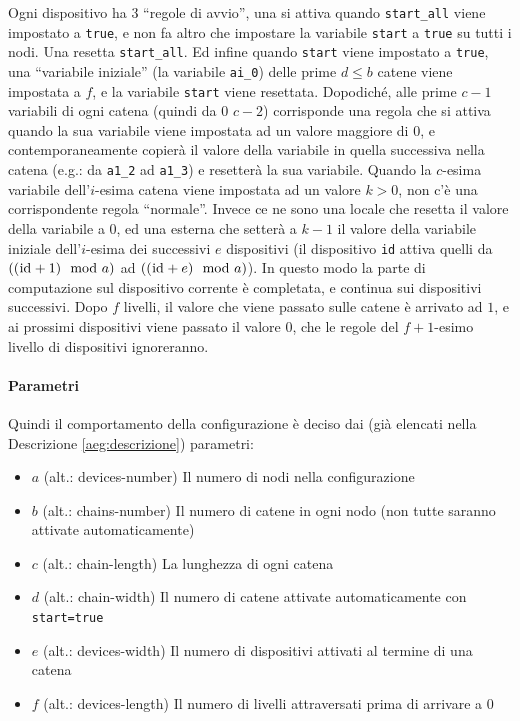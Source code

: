 \documentclass[12pt, a4paper]{article}
\begin{document}
Ogni dispositivo ha 3 ``regole di avvio'', una si attiva quando \lstinline{start_all} viene impostato a \lstinline{true}, e non fa altro che impostare la variabile \lstinline{start} a \lstinline{true} su tutti i nodi. Una resetta \lstinline{start_all}. Ed infine quando \lstinline{start} viene impostato a \lstinline{true}, una ``variabile iniziale'' (la variabile \lstinline{ai_0}) delle prime $d\leq b$ catene viene impostata a $f$, e la variabile \lstinline{start} viene resettata.
Dopodiché, alle prime $c-1$ variabili di ogni catena (quindi da $0$ $c-2$) corrisponde una regola che si attiva quando la sua variabile viene impostata ad un valore maggiore di $0$, e contemporaneamente copierà il valore della variabile in quella successiva nella catena (e.g.: da \lstinline{a1_2} ad \lstinline{a1_3}) e resetterà la sua variabile.
Quando la $c$-esima variabile dell'$i$-esima catena viene impostata ad un valore $k>0$, non c'è una corrispondente regola ``normale''. Invece ce ne sono una locale che resetta il valore della variabile a $0$, ed una esterna che setterà a $k-1$ il valore della variabile iniziale dell'$i$-esima dei successivi $e$ dispositivi (il dispositivo \lstinline{id} attiva quelli da $((\text{\lstinline{id}}+1)\mod a)$ ad $((\text{\lstinline{id}}+e)\mod a)$). In questo modo la parte di computazione sul dispositivo corrente è completata, e continua sui dispositivi successivi.
    Dopo $f$ livelli, il valore che viene passato sulle catene è arrivato ad $1$, e ai prossimi dispositivi viene passato il valore $0$, che le regole del $f+1$-esimo livello di dispositivi ignoreranno.

    \paragraph{Parametri}

    Quindi il comportamento della configurazione è deciso dai (già elencati nella Descrizione \ref{aeg:descrizione}) parametri:
    \begin{itemize}
        \item $a$ (alt.: devices-number) Il numero di nodi nella configurazione
        \item $b$ (alt.: chains-number) Il numero di catene in ogni nodo (non tutte saranno attivate automaticamente)
        \item $c$ (alt.: chain-length) La lunghezza di ogni catena
        \item $d$ (alt.: chain-width) Il numero di catene attivate automaticamente con \lstinline{start=true}
        \item $e$ (alt.: devices-width) Il numero di dispositivi attivati al termine di una catena
        \item $f$ (alt.: devices-length) Il numero di livelli attraversati prima di arrivare a $0$
    \end{itemize}
\end{document}
